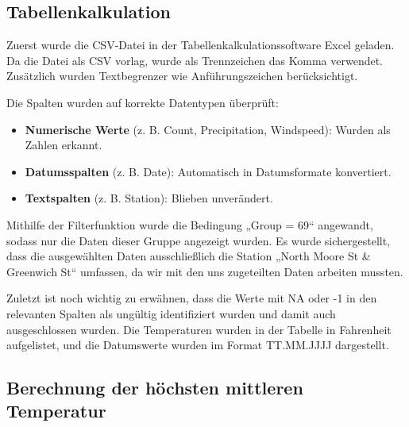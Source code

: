 \documentclass{article}
\begin{document}
\newpage 

\subsection{Tabellenkalkulation}
\label{sec:tabellenkalkulation}


Zuerst wurde die CSV-Datei in der Tabellenkalkulationssoftware Excel geladen. Da die Datei als CSV vorlag, wurde als Trennzeichen das Komma verwendet. Zusätzlich wurden Textbegrenzer wie Anführungszeichen berücksichtigt.

Die Spalten wurden auf korrekte Datentypen überprüft:
\begin{itemize}
    \item \textbf{Numerische Werte} (z. B. Count, Precipitation, Windspeed): Wurden als Zahlen erkannt.
    \item \textbf{Datumsspalten} (z. B. Date): Automatisch in Datumsformate konvertiert.
    \item \textbf{Textspalten} (z. B. Station): Blieben unverändert.
\end{itemize}

Mithilfe der Filterfunktion wurde die Bedingung „Group = 69“ angewandt, sodass nur die Daten dieser Gruppe angezeigt wurden. Es wurde sichergestellt, dass die ausgewählten Daten ausschließlich die Station „North Moore St \& Greenwich St“ umfassen, da wir mit den uns zugeteilten Daten arbeiten mussten.

Zuletzt ist noch wichtig zu erwähnen, dass die Werte mit NA oder -1 in den relevanten Spalten als ungültig identifiziert wurden und damit auch ausgeschlossen wurden. Die Temperaturen wurden in der Tabelle in Fahrenheit aufgelistet, und die Datumswerte wurden im Format TT.MM.JJJJ dargestellt.


\newpage 

\subsection{Berechnung der höchsten mittleren Temperatur}
\label{sec:berechnung-temperatur}
\end{document}
